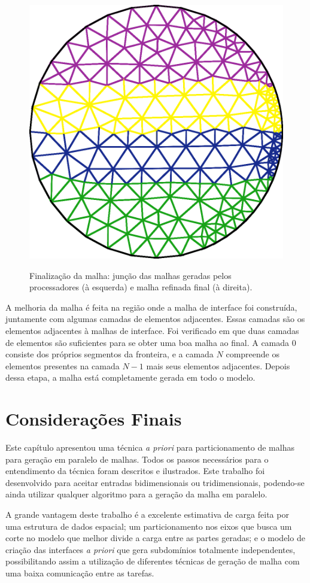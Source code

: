\begin{figure}[!ht]
{		\begin{minipage}[c]{0.35\textwidth}{\includegraphics[width=\textwidth]{fig/finaliza2.png}}\end{minipage}
	}
	\caption{Finalização da malha: junção das malhas geradas pelos processadores (à esquerda) e malha refinada final (à direita).}
	\label{fig:finaliza}
\end{figure}

A melhoria da malha é feita na região onde a malha de interface foi construída, juntamente com algumas camadas de elementos adjacentes. Essas camadas são os elementos adjacentes à malhas de interface. Foi verificado em \cite{bib:Ito07} que duas camadas de elementos são suficientes para se obter uma boa malha ao final. A camada $0$ consiste dos próprios segmentos da fronteira, e a camada $N$ compreende os elementos presentes na camada $N-1$ mais seus elementos adjacentes. Depois dessa etapa, a malha está completamente gerada em todo o modelo.


\section{Considerações Finais}

Este capítulo apresentou uma técnica \textit{a priori} para particionamento de malhas para geração em paralelo de malhas. Todos os passos necessários para o entendimento da técnica foram descritos e ilustrados. Este trabalho foi desenvolvido para aceitar entradas bidimensionais ou tridimensionais, podendo-se ainda utilizar qualquer algoritmo para a geração da malha em paralelo.

A grande vantagem deste trabalho é a excelente estimativa de carga feita por uma estrutura de dados espacial; um particionamento nos eixos que busca um corte no modelo que melhor divide a carga entre as partes geradas; e o modelo de criação das interfaces \textit{a priori} que gera subdomínios totalmente independentes, possibilitando assim a utilização de diferentes técnicas de geração de malha com uma baixa comunicação entre as tarefas.